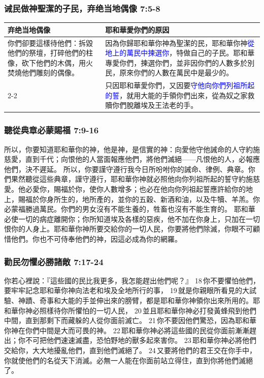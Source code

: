 \subsubsection{诫民做神聖潔的子民，弃绝当地偶像 7:5-8}
\begin{table}[H]
\begin{center}
\begin{tabular}{ p{4cm}|p{13cm} } \toprule
弃绝当地偶像 &耶和華愛你們的原因 \\\hline
\multirow{1}{4cm}{你們卻要這樣待他們：拆毀他們的祭壇，打碎他們的柱像，砍下他們的木偶，用火焚燒他們雕刻的偶像。} &因為你歸耶和華你神為聖潔的民，耶和華你神\textcolor{blue}{從地上的萬民中揀選你}，特做自己的子民。耶和華專愛你們，揀選你們，並非因你們的人數多於別民，原來你們的人數在萬民中是最少的。\\ \cline{2-2}
& 只因耶和華愛你們，又因要\textcolor{blue}{守他向你們列祖所起的誓}，就用大能的手領你們出來，從為奴之家救贖你們脫離埃及王法老的手。\\ \hline
\end{tabular}
\end{center}
\end{table}

\subsubsection{聽從典章必蒙賜福 7:9-16}
所以，你要知道耶和華你的神，他是神，是信實的神：向愛他守他誡命的人守約施慈愛，直到千代；向恨他的人當面報應他們，將他們滅絕——凡恨他的人，必報應他們，決不遲延。
所以，你要謹守遵行我今日所吩咐你的誡命、律例、典章。你們果然聽從這些典章，謹守遵行，耶和華你神就必照他向你列祖所起的誓守約施慈愛。他必愛你，賜福於你，使你人數增多；也必在他向你列祖起誓應許給你的地上，賜福於你身所生的，地所產的，並你的五穀、新酒和油，以及牛犢、羊羔。你必蒙福勝過萬民。你們的男女沒有不能生養的，牲畜也沒有不能生育的。
耶和華必使一切的病症離開你；你所知道埃及各樣的惡疾，他不加在你身上，只加在一切恨你的人身上。耶和華你神所要交給你的一切人民，你要將他們除滅，你眼不可顧惜他們。你也不可侍奉他們的神，因這必成為你的網羅。

\subsubsection{勸民勿懼必勝諸敵 7:17-24}
你若心裡說：『這些國的民比我更多，我怎能趕出他們呢？』 18 你不要懼怕他們，要牢牢記念耶和華你神向法老和埃及全地所行的事， 19 就是你親眼所看見的大試驗、神蹟、奇事和大能的手並伸出來的膀臂，都是耶和華你神領你出來所用的。耶和華你神必照樣待你所懼怕的一切人民， 20 並且耶和華你神必打發黃蜂飛到他們中間，直到那剩下而藏躲的人從你面前滅亡。 21 你不要因他們驚恐，因為耶和華你神在你們中間是大而可畏的神。 22 耶和華你神必將這些國的民從你面前漸漸趕出；你不可把他們速速滅盡，恐怕野地的獸多起來害你。 23 耶和華你神必將他們交給你，大大地擾亂他們，直到他們滅絕了。 24 又要將他們的君王交在你手中，你就使他們的名從天下消滅。必無一人能在你面前站立得住，直到你將他們滅絕了。

